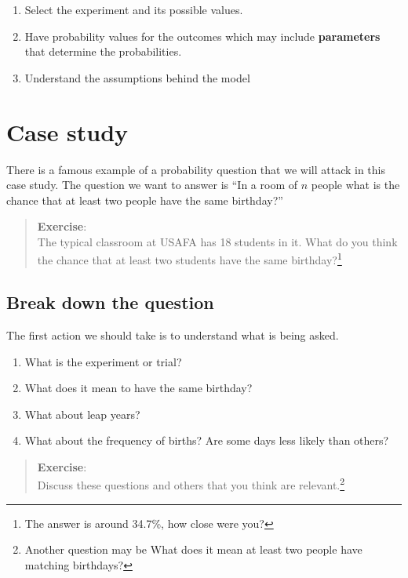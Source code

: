 \documentclass[
]{book}
\providecommand{\tightlist}{%
  \setlength{\itemsep}{0pt}\setlength{\parskip}{0pt}}
\begin{document}
\begin{enumerate}
\def\labelenumi{\arabic{enumi}.}
\tightlist
\item
  Select the experiment and its possible values.
\item
  Have probability values for the outcomes which may include \textbf{parameters} that determine the probabilities.
\item
  Understand the assumptions behind the model
\end{enumerate}

\hypertarget{case-study-1}{%
\section{Case study}\label{case-study-1}}

There is a famous example of a probability question that we will attack in this case study. The question we want to answer is ``In a room of \(n\) people what is the chance that at least two people have the same birthday?''

\begin{quote}
\textbf{Exercise}:\\
The typical classroom at USAFA has 18 students in it. What do you think the chance that at least two students have the same birthday?\footnote{The answer is around 34.7\%, how close were you?}
\end{quote}

\hypertarget{break-down-the-question}{%
\subsection{Break down the question}\label{break-down-the-question}}

The first action we should take is to understand what is being asked.

\begin{enumerate}
\def\labelenumi{\arabic{enumi}.}
\tightlist
\item
  What is the experiment or trial?
\item
  What does it mean to have the same birthday?
\item
  What about leap years?
\item
  What about the frequency of births? Are some days less likely than others?
\end{enumerate}

\begin{quote}
\textbf{Exercise}:\\
Discuss these questions and others that you think are relevant.\footnote{Another question may be What does it mean at least two people have matching birthdays?}
\end{quote}
\end{document}
